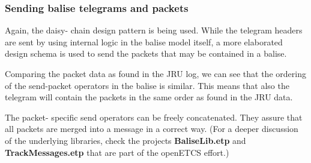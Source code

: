 \documentclass{template/openetcs_article}
\begin{document}
\subsubsection{Sending balise telegrams and packets}

Again, the daisy- chain design pattern is being used.
While the telegram headers are sent by using internal logic in the balise model itself, a more elaborated design schema is used to send the packets that may be contained in a balise.

Comparing the packet data as found in the JRU log, we can see that the ordering of the send-packet operators in the balise is similar. This means that also the telegram will contain the packets in the same order as found in the JRU data.

The packet- specific send operators can be freely concatenated. They assure that all packets are merged into a message in a correct way. (For a deeper discussion of the underlying libraries, check the projects \textbf{BaliseLib.etp} and \textbf{TrackMessages.etp} that are part of the openETCS effort.)
\end{document}
